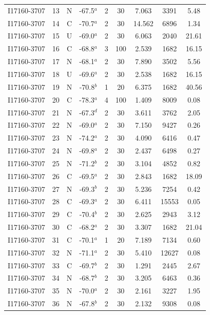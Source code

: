 \begin{table}
\begin{tabular}{ccccccccc}
I17160-3707 & 13 & N & -67.5$^{a}$ & 2 & 30 & 7.063 & 3391 & 5.48 \\
I17160-3707 & 14 & C & -70.7$^{a}$ & 2 & 30 & 14.562 & 6896 & 1.34 \\
I17160-3707 & 15 & U & -69.0$^{a}$ & 2 & 30 & 6.063 & 2040 & 21.61 \\
I17160-3707 & 16 & C & -68.8$^{a}$ & 3 & 100 & 2.539 & 1682 & 16.15 \\
I17160-3707 & 17 & N & -68.1$^{a}$ & 2 & 30 & 7.890 & 3502 & 5.56 \\
I17160-3707 & 18 & U & -69.6$^{a}$ & 2 & 30 & 2.538 & 1682 & 16.15 \\
I17160-3707 & 19 & N & -70.8$^{b}$ & 1 & 20 & 6.375 & 1682 & 40.56 \\
I17160-3707 & 20 & C & -78.3$^{a}$ & 4 & 100 & 1.409 & 8009 & 0.08 \\
I17160-3707 & 21 & N & -67.3$^{d}$ & 2 & 30 & 3.611 & 3762 & 2.05 \\
I17160-3707 & 22 & N & -69.0$^{a}$ & 2 & 30 & 7.150 & 9427 & 0.26 \\
I17160-3707 & 23 & N & -74.2$^{a}$ & 2 & 30 & 4.090 & 6416 & 0.47 \\
I17160-3707 & 24 & N & -69.8$^{a}$ & 2 & 30 & 2.437 & 6498 & 0.27 \\
I17160-3707 & 25 & N & -71.2$^{b}$ & 2 & 30 & 3.104 & 4852 & 0.82 \\
I17160-3707 & 26 & C & -69.5$^{a}$ & 2 & 30 & 2.843 & 1682 & 18.09 \\
I17160-3707 & 27 & N & -69.3$^{b}$ & 2 & 30 & 5.236 & 7254 & 0.42 \\
I17160-3707 & 28 & C & -69.3$^{a}$ & 2 & 30 & 6.411 & 15553 & 0.05 \\
I17160-3707 & 29 & C & -70.4$^{b}$ & 2 & 30 & 2.625 & 2943 & 3.12 \\
I17160-3707 & 30 & C & -68.2$^{a}$ & 2 & 30 & 3.307 & 1682 & 21.04 \\
I17160-3707 & 31 & C & -70.1$^{a}$ & 1 & 20 & 7.189 & 7134 & 0.60 \\
I17160-3707 & 32 & N & -71.1$^{a}$ & 2 & 30 & 5.410 & 12627 & 0.08 \\
I17160-3707 & 33 & C & -69.7$^{b}$ & 2 & 30 & 1.291 & 2445 & 2.67 \\
I17160-3707 & 34 & N & -68.7$^{b}$ & 2 & 30 & 3.205 & 6463 & 0.36 \\
I17160-3707 & 35 & N & -70.0$^{a}$ & 2 & 30 & 2.161 & 3227 & 1.95 \\
I17160-3707 & 36 & N & -67.8$^{b}$ & 2 & 30 & 2.132 & 9308 & 0.08 \\

\end{tabular}
\end{table}
